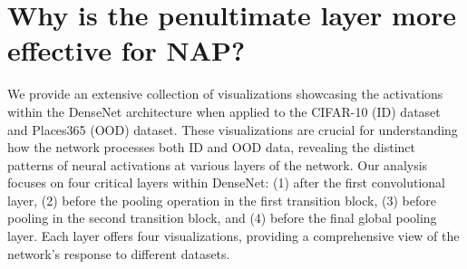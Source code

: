 \section{Why is the penultimate layer more effective for NAP?}
\label{appendix:layer}
We provide an extensive collection of visualizations showcasing the activations within the DenseNet architecture when applied to the CIFAR-10 (ID) dataset and Places365 (OOD) dataset. These visualizations are crucial for understanding how the network processes both ID and OOD data, revealing the distinct patterns of neural activations at various layers of the network.
Our analysis focuses on four critical layers within DenseNet: (1) after the first convolutional layer, (2) before the pooling operation in the first transition block, (3) before pooling in the second transition block, and (4) before the final global pooling layer. Each layer offers four visualizations, providing a comprehensive view of the network's response to different datasets.

